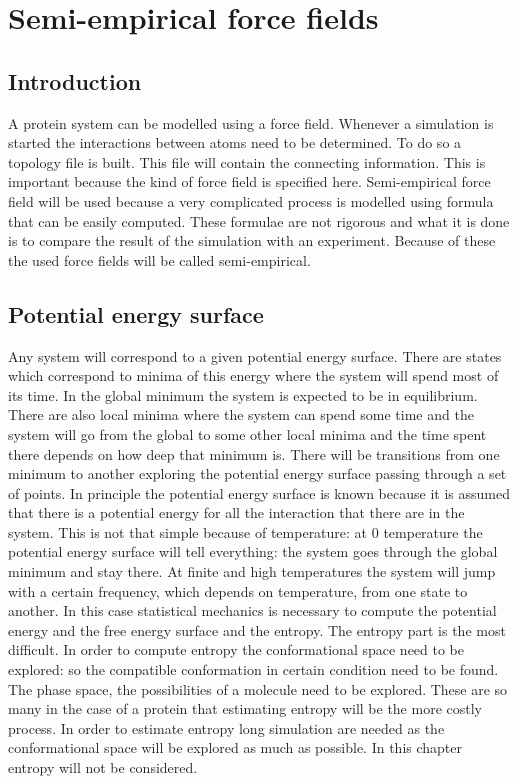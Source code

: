 \graphicspath{{chapters/03/images}}
\chapter{Semi-empirical force fields}

\section{Introduction}
A protein system can be modelled using a force field.
Whenever a simulation is started the interactions between atoms need to be determined.
To do so a topology file is built.
This file will contain the connecting information.
This is important because the kind of force field is specified here.
Semi-empirical force field will be used because a very complicated process is modelled using formula that can be easily computed.
These formulae are not rigorous and what it is done is to compare the result of the simulation with an experiment.
Because of these the used force fields will be called semi-empirical.

\section{Potential energy surface}
Any system will correspond to a given potential energy surface.
There are states which correspond to minima of this energy where the system will spend most of its time.
In the global minimum the system is expected to be in equilibrium.
There are also local minima where the system can spend some time and the system will go from the global to some other local minima and the time spent there depends on how deep that minimum is.
There will be transitions from one minimum to another exploring the potential energy surface passing through a set of points.
In principle the potential energy surface is known because it is assumed that there is a potential energy for all the interaction that there are in the system.
This is not that simple because of temperature: at $0$ temperature the potential energy surface will tell everything: the system goes through the global minimum and stay there.
At finite and high temperatures the system will jump with a certain frequency, which depends on temperature, from one state to another.
In this case statistical mechanics is necessary to compute the potential energy and the free energy surface and the entropy.
The entropy part is the most difficult.
In order to compute entropy the conformational space need to be explored: so the compatible conformation in certain condition need to be found.
The phase space, the possibilities of a molecule need to be explored.
These are so many in the case of a protein that estimating entropy will be the more costly process.
In order to estimate entropy long simulation are needed as the conformational space will be explored as much as possible.
In this chapter entropy will not be considered.

